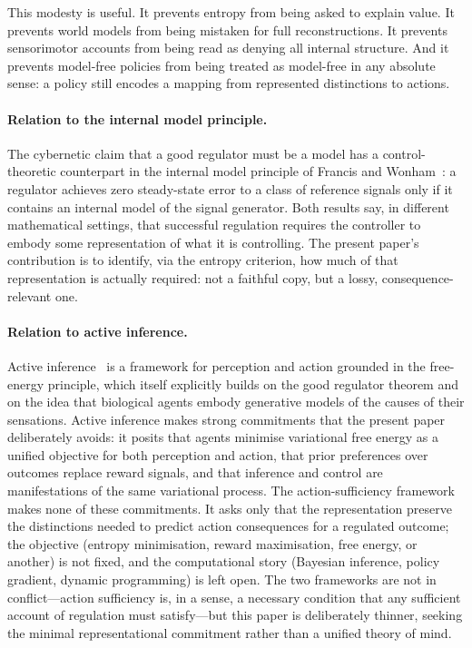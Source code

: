 \documentclass[11pt]{article}
\theoremstyle{remark}
\newcommand{\1}{\mathbb 1}
\begin{document}
This modesty is useful. It prevents entropy from being asked to explain value. It prevents world models from being mistaken for full reconstructions. It prevents sensorimotor accounts from being read as denying all internal structure. And it prevents model-free policies from being treated as model-free in any absolute sense: a policy still encodes a mapping from represented distinctions to actions.

\paragraph{Relation to the internal model principle.}
The cybernetic claim that a good regulator must be a model has a control-theoretic counterpart in the internal model principle of Francis and Wonham~\citep{Francis-internal76}: a regulator achieves zero steady-state error to a class of reference signals only if it contains an internal model of the signal generator. Both results say, in different mathematical settings, that successful regulation requires the controller to embody some representation of what it is controlling. The present paper's contribution is to identify, via the entropy criterion, how much of that representation is actually required: not a faithful copy, but a lossy, consequence-relevant one.

\paragraph{Relation to active inference.}
Active inference~\citep{Friston-free10} is a framework for perception and action grounded in the free-energy principle, which itself explicitly builds on the good regulator theorem and on the idea that biological agents embody generative models of the causes of their sensations. Active inference makes strong commitments that the present paper deliberately avoids: it posits that agents minimise variational free energy as a unified objective for both perception and action, that prior preferences over outcomes replace reward signals, and that inference and control are manifestations of the same variational process. The action-sufficiency framework makes none of these commitments. It asks only that the representation preserve the distinctions needed to predict action consequences for a regulated outcome; the objective (entropy minimisation, reward maximisation, free energy, or another) is not fixed, and the computational story (Bayesian inference, policy gradient, dynamic programming) is left open. The two frameworks are not in conflict---action sufficiency is, in a sense, a necessary condition that any sufficient account of regulation must satisfy---but this paper is deliberately thinner, seeking the minimal representational commitment rather than a unified theory of mind.
\end{document}
